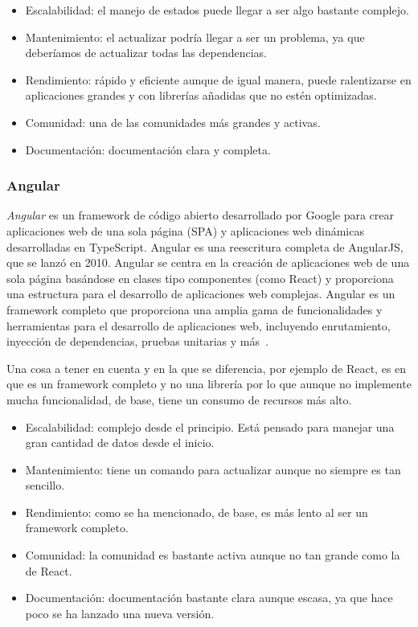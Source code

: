 \begin{itemize}
    \item[\bien] Escalabilidad: el manejo de estados puede llegar a ser algo bastante complejo.
    \item[\regular] Mantenimiento: el actualizar podría llegar a ser un problema, ya que deberíamos de actualizar todas las dependencias.
    \item[\regular] Rendimiento: rápido y eficiente aunque de igual manera, puede ralentizarse en aplicaciones grandes y con librerías añadidas que no estén optimizadas.
    \item[\esp] Comunidad: una de las comunidades más grandes y activas.
    \item[\bien] Documentación: documentación clara y completa.
\end{itemize}

\subsubsection{Angular}

\textit{Angular} es un framework de código abierto desarrollado por Google para crear aplicaciones web de una sola página (SPA) y aplicaciones web dinámicas desarrolladas en TypeScript. Angular es una reescritura completa de AngularJS, que se lanzó en 2010. Angular se centra en la creación de aplicaciones web de una sola página basándose en clases tipo componentes (como React) y proporciona una estructura para el desarrollo de aplicaciones web complejas. Angular es un framework completo que proporciona una amplia gama de funcionalidades y herramientas para el desarrollo de aplicaciones web, incluyendo enrutamiento, inyección de dependencias, pruebas unitarias y más~\cite{angular-wikipedia}.

Una cosa a tener en cuenta y en la que se diferencia, por ejemplo de React, es en que es un framework completo y no una librería por lo que aunque no implemente mucha funcionalidad, de base, tiene un consumo de recursos más alto.

\begin{itemize}
    \item[\regular] Escalabilidad: complejo desde el principio. Está pensado para manejar una gran cantidad de datos desde el inicio.
    \item[\bien] Mantenimiento: tiene un comando para actualizar aunque no siempre es tan sencillo.
    \item[\regular] Rendimiento: como se ha mencionado, de base, es más lento al ser un framework completo.
    \item[\regular] Comunidad: la comunidad es bastante activa aunque no tan grande como la de React.
    \item[\regular] Documentación: documentación bastante clara aunque escasa, ya que hace poco se ha lanzado una nueva versión.
\end{itemize}

